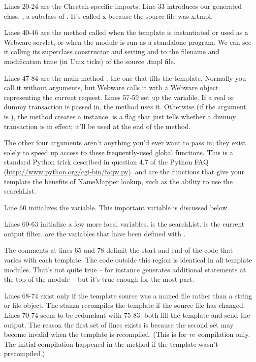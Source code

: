 Lines 20-24 are the Cheetah-specific imports.  Line 33 introduces our generated
class, , a subclass of .  It's called x because the
source file was x.tmpl.

Lines 40-46 are the  method called when the template is
instantiated or used as a Webware servlet, or when the module is run as a
standalone program.  We can see it calling its superclass constructor and
setting  and  to the filename and
modification time (in Unix ticks) of the source .tmpl file.

Lines 47-84 are the main method , the one that fills the
template.  Normally you call it without arguments, but Webware calls it with a
Webware  object representing the current request.  Lines
57-59 set up the  variable.  If a real or dummy transaction is
passed in, the method uses it.  Otherwise (if the  argument is
), the method creates a  instance.
 is a flag that just tells whether a dummy transaction is in
effect; it'll be used at the end of the method.  

The other four  arguments aren't anything you'd ever want to
pass in; they exist solely to speed up access to these frequently-used
global functions.  This is a standard Python trick described in question 4.7
of the Python FAQ (\url{http://www.python.org/cgi-bin/faqw.py}).
 and  are the functions that give your template the
benefits of NameMapper lookup, such as the ability to use the searchList.  

Line 60 initializes the  variable.  This important variable is
discussed below.  

Lines 60-63 initialize a few more local variables.   is the 
searchList.   is the current output filter.  
are the variables that have been defined with .

The comments at lines 65 and 78 delimit the start and end of the code that
varies with each template.  The code outside this region is identical in all
template modules.  That's not quite true --  for instance
generates additional  statements at the top of the module --
but it's true enough for the most part.

Lines 68-74 exist only if the template source was a named file rather than
a string or file object.  The stanza recompiles the template if the source
file has changed.  Lines 70-74 seem to be redundant with 75-83: both 
fill the template and send the output.  The reason the first set of lines
exists is because the second set may become invalid when the template is
recompiled.  (This is for {\em re}\ compilation only.  The initial compilation
happened in the  method if the template wasn't 
precompiled.)

